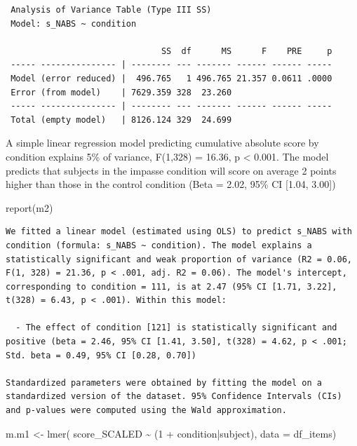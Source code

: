 \documentclass[
  letterpaper,
  DIV=11,
  numbers=noendperiod]{scrreprt}
\newenvironment{Shaded}{\begin{snugshade}}{\end{snugshade}}
\newcommand{\AttributeTok}[1]{\textcolor[rgb]{0.40,0.45,0.13}{#1}}
\newcommand{\DecValTok}[1]{\textcolor[rgb]{0.68,0.00,0.00}{#1}}
\newcommand{\FunctionTok}[1]{\textcolor[rgb]{0.28,0.35,0.67}{#1}}
\newcommand{\NormalTok}[1]{\textcolor[rgb]{0.00,0.23,0.31}{#1}}
\newcommand{\OtherTok}[1]{\textcolor[rgb]{0.00,0.23,0.31}{#1}}
\newcommand{\SpecialCharTok}[1]{\textcolor[rgb]{0.37,0.37,0.37}{#1}}
\begin{document}
\begin{verbatim}
 Analysis of Variance Table (Type III SS)
 Model: s_NABS ~ condition

                               SS  df      MS      F    PRE     p
 ----- --------------- | -------- --- ------- ------ ------ -----
 Model (error reduced) |  496.765   1 496.765 21.357 0.0611 .0000
 Error (from model)    | 7629.359 328  23.260                    
 ----- --------------- | -------- --- ------- ------ ------ -----
 Total (empty model)   | 8126.124 329  24.699                    
\end{verbatim}

A simple linear regression model predicting cumulative absolute score by
condition explains 5\% of variance, F(1,328) = 16.36, p \textless{}
0.001. The model predicts that subjects in the impasse condition will
score on average 2 points higher than those in the control condition
(Beta = 2.02, 95\% CI {[}1.04, 3.00{]})

\begin{Shaded}
\begin{Highlighting}[]
\FunctionTok{report}\NormalTok{(m2)}
\end{Highlighting}
\end{Shaded}

\begin{verbatim}
We fitted a linear model (estimated using OLS) to predict s_NABS with condition (formula: s_NABS ~ condition). The model explains a statistically significant and weak proportion of variance (R2 = 0.06, F(1, 328) = 21.36, p < .001, adj. R2 = 0.06). The model's intercept, corresponding to condition = 111, is at 2.47 (95% CI [1.71, 3.22], t(328) = 6.43, p < .001). Within this model:

  - The effect of condition [121] is statistically significant and positive (beta = 2.46, 95% CI [1.41, 3.50], t(328) = 4.62, p < .001; Std. beta = 0.49, 95% CI [0.28, 0.70])

Standardized parameters were obtained by fitting the model on a standardized version of the dataset. 95% Confidence Intervals (CIs) and p-values were computed using the Wald approximation.
\end{verbatim}

\begin{Shaded}
\begin{Highlighting}[]
\NormalTok{m.m1 }\OtherTok{\textless{}{-}} \FunctionTok{lmer}\NormalTok{( score\_SCALED }\SpecialCharTok{\textasciitilde{}}\NormalTok{ (}\DecValTok{1} \SpecialCharTok{+}\NormalTok{ condition}\SpecialCharTok{|}\NormalTok{subject), }\AttributeTok{data =}\NormalTok{ df\_items)}
\end{Highlighting}
\end{Shaded}
\end{document}
